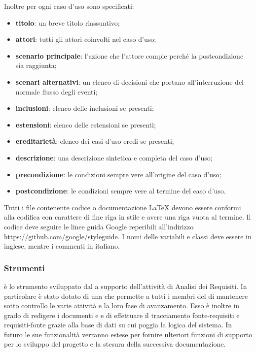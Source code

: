 \documentclass[a4paper, titlepage]{article}
\begin{document}
Inoltre per ogni caso d'uso sono specificati:
\begin{itemize}
\item \textbf{titolo}: un breve titolo riassuntivo;
\item \textbf{attori}: tutti gli attori coinvolti nel caso d'uso;
\item \textbf{scenario principale}: l'azione che l'attore compie perché la postcondizione sia raggiunta;
\item \textbf{scenari alternativi}: un elenco di decisioni che portano all'interruzione del normale flusso degli eventi;
\item \textbf{inclusioni}: elenco delle inclusioni se presenti;
\item \textbf{estensioni}: elenco delle estensioni se presenti;
\item \textbf{ereditarietà}: elenco dei casi d'uso eredi se presenti;
\item \textbf{descrizione}: una descrizione sintetica e completa del caso d'uso;
\item \textbf{precondizione}: le condizioni sempre vere all'origine del caso d'uso;
\item \textbf{postcondizione}: le condizioni sempre vere al termine del caso d'uso.
\end{itemize}

Tutti i file contenente codice o documentazione \LaTeX{} devono essere conformi alla codifica  con carattere di fine riga in stile  e avere una riga vuota al termine.
Il codice deve seguire le linee guida Google reperibili all'indirizzo \url{https://github.com/google/styleguide}. I nomi delle variabili e classi deve essere in inglese, mentre i commenti in italiano.

\subsubsection{Strumenti}

 è lo strumento sviluppato dal  a supporto dell'attività di Analisi dei Requisiti. In particolare è stato dotato di una  che permette a tutti i membri del  di mantenere sotto controllo le varie attività e la loro fase di avanzamento. Esso è inoltre in grado di redigere i documenti  e  e di effettuare il tracciamento fonte-requisiti e requisiti-fonte grazie alla base di dati su cui poggia la logica del sistema. In futuro le sue funzionalità verranno estese per fornire ulteriori funzioni
di supporto per lo sviluppo del progetto e la stesura della successiva documentazione.
\end{document}
